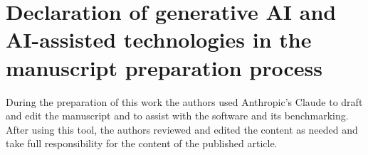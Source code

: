 \documentclass[preprint,12pt, a4paper]{elsarticle}
\begin{document}
\section*{Declaration of generative AI and AI-assisted technologies in the manuscript preparation process}

During the preparation of this work the authors used Anthropic's Claude to draft and edit the manuscript and to assist with the software and its benchmarking. After using this tool, the authors reviewed and edited the content as needed and take full responsibility for the content of the published article.


\end{document}

